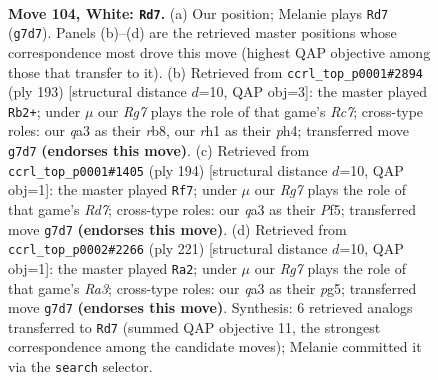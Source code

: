\documentclass[11pt]{article}
\begin{document}
\clearpage

\begin{figure}[p]\centering
\begin{subfigure}{0.46\textwidth}\centering
\resizebox{\linewidth}{!}{%
\newchessgame
\chessboard[
  setfen={1k6/6R1/8/8/p7/q7/5K2/7r w - - 2 104},
  showmover=false,
  pgfstyle=straightmove, color=movearrow, markmove={g7-d7}
]}
\caption{}
\end{subfigure}\hfill
\begin{subfigure}{0.46\textwidth}\centering
\resizebox{\linewidth}{!}{%
\newchessgame
\chessboard[
  setfen={1R6/1P4k1/8/1K6/7P/8/2r5/8 b - - 6 97},
  showmover=false,
  pgfstyle=straightmove, color=movearrow, markmove={c2-b2}
]}
\caption{}
\end{subfigure}
\\[4pt]
\begin{subfigure}{0.46\textwidth}\centering
\resizebox{\linewidth}{!}{%
\newchessgame
\chessboard[
  setfen={8/3R4/5p1k/5P2/1r6/5K2/8/8 w - - 8 98},
  showmover=false,
  pgfstyle=straightmove, color=movearrow, markmove={d7-f7}
]}
\caption{}
\end{subfigure}\hfill
\begin{subfigure}{0.46\textwidth}\centering
\resizebox{\linewidth}{!}{%
\newchessgame
\chessboard[
  setfen={6k1/1R6/r7/5KP1/8/6P1/8/8 b - - 18 111},
  showmover=false,
  pgfstyle=straightmove, color=movearrow, markmove={a6-a2}
]}
\caption{}
\end{subfigure}
\caption{\textbf{Move 104, White: \texttt{Rd7}.} (a) Our position; Melanie plays \texttt{Rd7} (\texttt{g7d7}). Panels (b)--(d) are the retrieved master positions whose correspondence most drove this move (highest QAP objective among those that transfer to it). (b) Retrieved from \texttt{ccrl\_top\_p0001\#2894} (ply 193) [structural distance $d$=10, QAP obj=3]: the master played \texttt{Rb2+}; under $\mu$ our \emph{Rg7} plays the role of that game's \emph{Rc7}; cross-type roles: our \emph{q}a3 as their \emph{r}b8, our \emph{r}h1 as their \emph{p}h4; transferred move \texttt{g7d7} \textbf{(endorses this move)}. (c) Retrieved from \texttt{ccrl\_top\_p0001\#1405} (ply 194) [structural distance $d$=10, QAP obj=1]: the master played \texttt{Rf7}; under $\mu$ our \emph{Rg7} plays the role of that game's \emph{Rd7}; cross-type roles: our \emph{q}a3 as their \emph{P}f5; transferred move \texttt{g7d7} \textbf{(endorses this move)}. (d) Retrieved from \texttt{ccrl\_top\_p0002\#2266} (ply 221) [structural distance $d$=10, QAP obj=1]: the master played \texttt{Ra2}; under $\mu$ our \emph{Rg7} plays the role of that game's \emph{Ra3}; cross-type roles: our \emph{q}a3 as their \emph{p}g5; transferred move \texttt{g7d7} \textbf{(endorses this move)}. Synthesis: 6 retrieved analogs transferred to \texttt{Rd7} (summed QAP objective 11, the strongest correspondence among the candidate moves); Melanie committed it via the \texttt{search} selector.}
\label{fig:thought-m206}
\end{figure}
\end{document}
